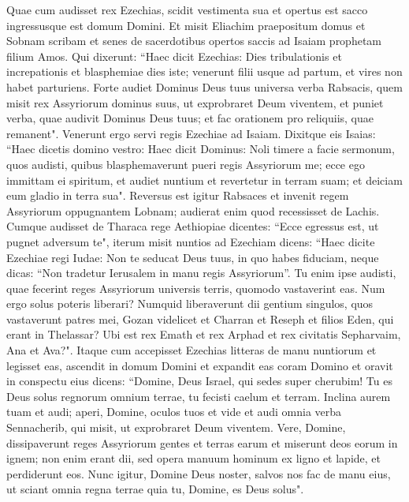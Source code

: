 \begin{biblechapter}  
\verse Quae cum audisset rex Ezechias, scidit vestimenta sua et opertus est sacco ingressusque est domum Domini. 
\verse Et misit Eliachim praepositum domus et Sobnam scribam et senes de sacerdotibus opertos saccis ad Isaiam prophetam filium Amos. 
\verse Qui dixerunt: “Haec dicit Ezechias: Dies tribulationis et increpationis et blasphemiae dies iste; venerunt filii usque ad partum, et vires non habet parturiens. 
\verse Forte audiet Dominus Deus tuus universa verba Rabsacis, quem misit rex Assyriorum dominus suus, ut exprobraret Deum viventem, et puniet verba, quae audivit Dominus Deus tuus; et fac orationem pro reliquiis, quae remanent". 
\verse Venerunt ergo servi regis Ezechiae ad Isaiam. 
\verse Dixitque eis Isaias: “Haec dicetis domino vestro: Haec dicit Dominus: Noli timere a facie sermonum, quos audisti, quibus blasphemaverunt pueri regis Assyriorum me; 
\verse ecce ego immittam ei spiritum, et audiet nuntium et revertetur in terram suam; et deiciam eum gladio in terra sua". 
\verse Reversus est igitur Rabsaces et invenit regem Assyriorum oppugnantem Lobnam; audierat enim quod recessisset de Lachis. 
\verse Cumque audisset de Tharaca rege Aethiopiae dicentes: “Ecce egressus est, ut pugnet adversum te", iterum misit nuntios ad Ezechiam dicens: 
\verse “Haec dicite Ezechiae regi Iudae: Non te seducat Deus tuus, in quo habes fiduciam, neque dicas: “Non tradetur Ierusalem in manu regis Assyriorum”. 
\verse Tu enim ipse audisti, quae fecerint reges Assyriorum universis terris, quomodo vastaverint eas. Num ergo solus poteris liberari? 
\verse Numquid liberaverunt dii gentium singulos, quos vastaverunt patres mei, Gozan videlicet et Charran et Reseph et filios Eden, qui erant in Thelassar? 
\verse Ubi est rex Emath et rex Arphad et rex civitatis Sepharvaim, Ana et Ava?". 
\verse Itaque cum accepisset Ezechias litteras de manu nuntiorum et legisset eas, ascendit in domum Domini et expandit eas coram Domino 
\verse et oravit in conspectu eius dicens: “Domine, Deus Israel, qui sedes super cherubim! Tu es Deus solus regnorum omnium terrae, tu fecisti caelum et terram. 
\verse Inclina aurem tuam et audi; aperi, Domine, oculos tuos et vide et audi omnia verba Sennacherib, qui misit, ut exprobraret Deum viventem. 
\verse Vere, Domine, dissipaverunt reges Assyriorum gentes et terras earum 
\verse et miserunt deos eorum in ignem; non enim erant dii, sed opera manuum hominum ex ligno et lapide, et perdiderunt eos. 
\verse Nunc igitur, Domine Deus noster, salvos nos fac de manu eius, ut sciant omnia regna terrae quia tu, Domine, es Deus solus". 

\end{biblechapter}
